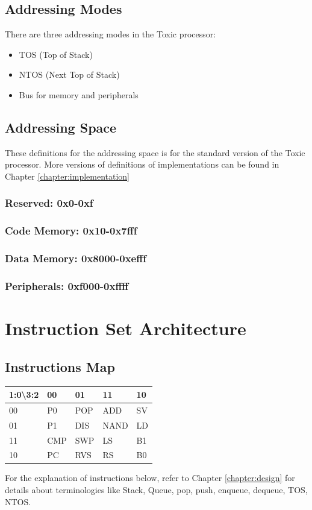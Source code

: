 \documentclass[11pt]{report}
\begin{document}
    \section{Addressing Modes}
    There are three addressing modes in the Toxic processor:
    \begin{itemize}
        \item TOS (Top of Stack)
        \item NTOS (Next Top of Stack)
        \item Bus for memory and peripherals
    \end{itemize}

    \section{Addressing Space}
    These definitions for the addressing space is for the standard version of the Toxic processor.
    More versions of definitions of implementations can be found in Chapter \ref{chapter:implementation}
    \label{section:addressingspace}
    \subsection{Reserved: 0x0-0xf}
    \subsection{Code Memory: 0x10-0x7fff}
    \subsection{Data Memory: 0x8000-0xefff}
    \subsection{Peripherals: 0xf000-0xffff}

    \chapter{Instruction Set Architecture}
    \section{Instructions Map}
    \begin{table}[h]
        \begin{tabular}{|l|l|l|l|l|}
        \hline
        1:0\textbackslash{}3:2 & 00  & 01  & 11   & 10 \\ \hline
        00                     & P0  & POP & ADD  & SV \\ \hline
        01                     & P1  & DIS & NAND & LD \\ \hline
        11                     & CMP & SWP & LS   & B1 \\ \hline
        10                     & PC  & RVS & RS   & B0 \\ \hline
        \end{tabular}
    \end{table}
    For the explanation of instructions below, refer to Chapter \ref{chapter:design} for details
    about terminologies like Stack, Queue, pop, push, enqueue, dequeue, TOS, NTOS.
\end{document}
